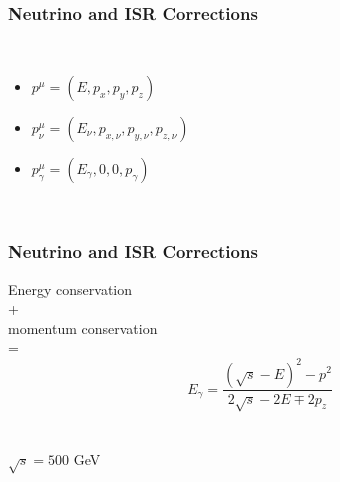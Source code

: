 \begin{frame}\frametitle{Neutrino and ISR Corrections }

    \begin{minipage}{0.49\textwidth}
        \\
        \begin{itemize}\setlength\itemsep{1em}
            \item {} ${p}^{\mu} = ( E, {p}_{x}, {p}_{y}, {p}_{z} )$
            \item {} ${p}_{\nu}^{\mu} = (  {E}_{\nu}, {p}_{x, \nu}, {p}_{y, \nu}, {p}_{z, \nu} )$
            \item {} ${p}_{\gamma}^{\mu} = ( {E}_{\gamma}, 0, 0, {p}_{\gamma} )$
        \end{itemize}
    \end{minipage}\hfill
    \begin{minipage}{0.49\textwidth}
        \resizebox{\linewidth}{!}{%
        \centering
        
        }
        \\
        \centering
        
    \end{minipage}

\end{frame}

\begin{frame}\frametitle{Neutrino and ISR Corrections }

    \begin{minipage}{0.49\textwidth}
        \centering
        Energy conservation \\
        + \\
        momentum conservation\\
        = \\
        \begin{equation*}
            {E}_{\gamma} = \frac{ {( \sqrt{s} - E )}^2 - {p}^{2} }{2 \sqrt{s} -2 E  \mp 2{p}_{z}}
        \end{equation*}
        \\ \hfill \\
        $ \sqrt{s} = 500 $ GeV
    \end{minipage}\hfill
    \begin{minipage}{0.49\textwidth}
        \resizebox{\linewidth}{!}{%
        \centering
        
        }
        \\
        \centering
        
    \end{minipage}

\end{frame}

